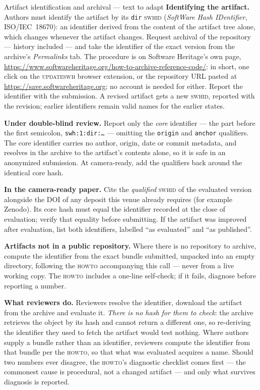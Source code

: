 \begin{callout}{Artifact identification and archival --- text to adapt}
\small
\textbf{Identifying the artifact.} Authors must identify the artifact by its \texttt{dir}
\textsc{swhid} (\emph{SoftWare Hash IDentifier}, ISO/IEC~18670): an identifier derived from the
content of the artifact tree alone, which changes whenever the artifact changes. Request archival
of the repository --- history included --- and take the identifier of the exact version from the
archive's \emph{Permalinks} tab. The procedure is on Software Heritage's own page,
\url{https://www.softwareheritage.org/how-to-archive-reference-code/}: in short, one click on the
\textsc{updateswh} browser extension, or the repository URL pasted at
\url{https://save.softwareheritage.org}; no account is needed for either. Report the identifier
with the submission. A
revised artifact gets a new \textsc{swhid}, reported with the revision; earlier identifiers remain
valid names for the earlier states.

\smallskip
\textbf{Under double-blind review.} Report only the \emph{core} identifier --- the part before
the first semicolon, \texttt{swh:1:dir:\dots} --- omitting the \texttt{origin} and \texttt{anchor}
qualifiers. The core identifier carries no author, origin, date or commit metadata, and resolves
in the archive to the artifact's contents alone, so it is safe in an anonymized submission. At
camera-ready, add the qualifiers back around the identical core hash.

\smallskip
\textbf{In the camera-ready paper.} Cite the \emph{qualified} \textsc{swhid} of the evaluated
version alongside the DOI of any deposit this venue already requires (for example Zenodo). Its
core hash must equal the identifier recorded at the close of evaluation; verify that equality
before submitting. If the artifact was improved after evaluation, list both identifiers, labelled
\enquote{as evaluated} and \enquote{as published}.

\smallskip
\textbf{Artifacts not in a public repository.} Where there is no repository to archive, compute
the identifier from the exact bundle submitted, unpacked into an empty directory, following the
\textsc{howto} accompanying this call --- never from a live working copy. The \textsc{howto}
includes a one-line self-check; if it fails, diagnose before reporting a number.

\smallskip
\textbf{What reviewers do.} Reviewers resolve the identifier, download the artifact from the
archive and evaluate it. \emph{There is no hash for them to check}: the archive retrieves the
object by its hash and cannot return a different one, so re-deriving the identifier they used to
fetch the artifact would test nothing. Where authors supply a bundle rather than an identifier,
reviewers compute the identifier from that bundle per the \textsc{howto}, so that what was
evaluated acquires a name. Should two numbers ever disagree, the \textsc{howto}'s diagnostic
checklist comes first --- the commonest cause is procedural, not a changed artifact --- and only
what survives diagnosis is reported.


\end{callout}

